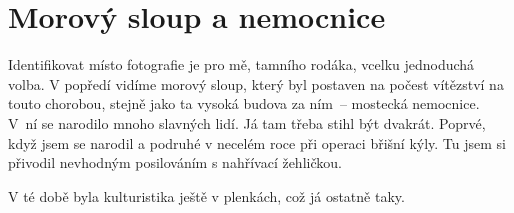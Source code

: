 
\chapter{Morový sloup a nemocnice}

Identifikovat místo fotografie je pro mě, tamního rodáka, vcelku jednoduchá
volba. V popředí vidíme morový sloup, který byl postaven na počest vítězství na
touto chorobou, stejně jako ta vysoká budova za ním~-- mostecká nemocnice. V~ní
se narodilo mnoho slavných lidí. Já tam třeba stihl být dvakrát. Poprvé, když
jsem se narodil a podruhé v necelém roce při operaci břišní kýly. Tu jsem si
přivodil nevhodným posilováním s nahřívací žehličkou.

V té době byla kulturistika ještě v plenkách, což já ostatně taky.


